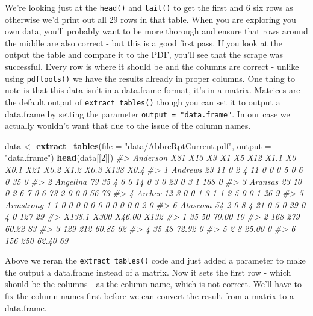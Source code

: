 \documentclass[
  12pt,
]{book}
\newenvironment{Shaded}{\begin{snugshade}}{\end{snugshade}}
\newcommand{\CommentTok}[1]{\textcolor[rgb]{0.37,0.37,0.37}{\textit{#1}}}
\newcommand{\DataTypeTok}[1]{\textcolor[rgb]{0.27,0.27,0.27}{#1}}
\newcommand{\DecValTok}[1]{\textcolor[rgb]{0.06,0.06,0.06}{#1}}
\newcommand{\KeywordTok}[1]{\textcolor[rgb]{0.27,0.27,0.27}{\textbf{#1}}}
\newcommand{\NormalTok}[1]{#1}
\newcommand{\StringTok}[1]{\textcolor[rgb]{0.5,0.5,0.5}{#1}}
\begin{document}
We're looking just at the \texttt{head()} and \texttt{tail()} to get the first and 6 six rows as otherwise we'd print out all 29 rows in that table. When you are exploring you own data, you'll probably want to be more thorough and ensure that rows around the middle are also correct - but this is a good first pass. If you look at the output the table and compare it to the PDF, you'll see that the scrape was successful. Every row is where it should be and the columns are correct - unlike using \texttt{pdftools()} we have the results already in proper columns. One thing to note is that this data isn't in a data.frame format, it's in a matrix. Matrices are the default output of \texttt{extract\_tables()} though you can set it to output a data.frame by setting the parameter \texttt{output\ =\ "data.frame"}. In our case we actually wouldn't want that due to the issue of the column names.

\begin{Shaded}
\begin{Highlighting}[]
\NormalTok{data <{-}}\StringTok{ }\KeywordTok{extract\_tables}\NormalTok{(}\DataTypeTok{file =} \StringTok{"data/AbbreRptCurrent.pdf"}\NormalTok{, }\DataTypeTok{output =} \StringTok{"data.frame"}\NormalTok{)}
\KeywordTok{head}\NormalTok{(data[[}\DecValTok{2}\NormalTok{]])}
\CommentTok{\#>    Anderson X81 X13 X3 X1 X5 X12 X1.1 X0 X0.1 X21 X0.2 X1.2 X0.3 X138 X0.4}
\CommentTok{\#> 1   Andrews  23  11  0  2  4  11    0  0    0   5    0    6    0   35    0}
\CommentTok{\#> 2  Angelina  79  35  4  6  0  14    0  3    0  23    0    3    1  168    0}
\CommentTok{\#> 3   Aransas  23  10  0  2  6   7    0  6   73   2    0    0    0   56   73}
\CommentTok{\#> 4    Archer  12   3  0  0  1   3    1  1    2   5    0    0    1   26    9}
\CommentTok{\#> 5 Armstrong   1   1  0  0  0   0    0  0    0   0    0    0    0    2    0}
\CommentTok{\#> 6  Atascosa  54   2  0  8  4  21    0  5    0  29    0    4    0  127   29}
\CommentTok{\#>   X138.1 X300 X46.00 X132}
\CommentTok{\#> 1     35   50  70.00   10}
\CommentTok{\#> 2    168  279  60.22   83}
\CommentTok{\#> 3    129  212  60.85   62}
\CommentTok{\#> 4     35   48  72.92    0}
\CommentTok{\#> 5      2    8  25.00    0}
\CommentTok{\#> 6    156  250  62.40   69}
\end{Highlighting}
\end{Shaded}

Above we reran the \texttt{extract\_tables()} code and just added a parameter to make the output a data.frame instead of a matrix. Now it sets the first row - which should be the columns - as the column name, which is not correct. We'll have to fix the column names first before we can convert the result from a matrix to a data.frame.
\end{document}
